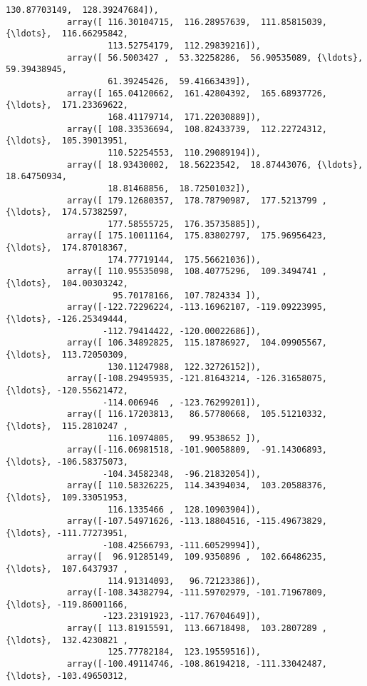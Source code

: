 \documentclass[11pt]{article}
\begin{document}
\begin{Verbatim}[commandchars=\\\{\}]
                    130.87703149,  128.39247684]),
            array([ 116.30104715,  116.28957639,  111.85815039, {\ldots},  116.66295842,
                    113.52754179,  112.29839216]),
            array([ 56.5003427 ,  53.32258286,  56.90535089, {\ldots},  59.39438945,
                    61.39245426,  59.41663439]),
            array([ 165.04120662,  161.42804392,  165.68937726, {\ldots},  171.23369622,
                    168.41179714,  171.22030889]),
            array([ 108.33536694,  108.82433739,  112.22724312, {\ldots},  105.39013951,
                    110.52254553,  110.29089194]),
            array([ 18.93430002,  18.56223542,  18.87443076, {\ldots},  18.64750934,
                    18.81468856,  18.72501032]),
            array([ 179.12680357,  178.78790987,  177.5213799 , {\ldots},  174.57382597,
                    177.58555725,  176.35735885]),
            array([ 175.10011164,  175.83802797,  175.96956423, {\ldots},  174.87018367,
                    174.77719144,  175.56621036]),
            array([ 110.95535098,  108.40775296,  109.3494741 , {\ldots},  104.00303242,
                     95.70178166,  107.7824334 ]),
            array([-122.72296224, -113.16962107, -119.09223995, {\ldots}, -126.25349444,
                   -112.79414422, -120.00022686]),
            array([ 106.34892825,  115.18786927,  104.09905567, {\ldots},  113.72050309,
                    130.11247988,  122.32726152]),
            array([-108.29495935, -121.81643214, -126.31658075, {\ldots}, -120.55621472,
                   -114.006946  , -123.76299201]),
            array([ 116.17203813,   86.57780668,  105.51210332, {\ldots},  115.2810247 ,
                    116.10974805,   99.9538652 ]),
            array([-116.06981518, -101.90058809,  -91.14306893, {\ldots}, -106.58375073,
                   -104.34582348,  -96.21832054]),
            array([ 110.58326225,  114.34394034,  103.20588376, {\ldots},  109.33051953,
                    116.1335466 ,  128.10903904]),
            array([-107.54971626, -113.18804516, -115.49673829, {\ldots}, -111.77273951,
                   -108.42566793, -111.60529994]),
            array([  96.91285149,  109.9350896 ,  102.66486235, {\ldots},  107.6437937 ,
                    114.91314093,   96.72123386]),
            array([-108.34382794, -111.59702979, -101.71967809, {\ldots}, -119.86001166,
                   -123.23191923, -117.76704649]),
            array([ 113.81915591,  113.66718498,  103.2807289 , {\ldots},  132.4230821 ,
                    125.77782184,  123.19559516]),
            array([-100.49114746, -108.86194218, -111.33042487, {\ldots}, -103.49650312,

\end{Verbatim}
\end{document}

